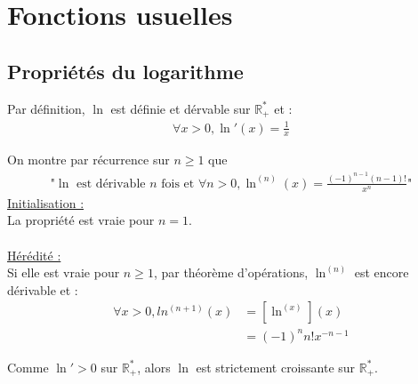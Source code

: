 \documentclass[../main.tex]{subfiles}
\begin{document}
\setcounter{chapter}{4}
\chapter{Fonctions usuelles}
\tableofcontents
\clearpage

\setcounter{section}{1}
\section{Propriétés du logarithme}
Par définition, $\ln$ est définie et dérvable sur $\mathbb{R}_+^*$ et :
\begin{align*}
    \forall x > 0, \ln'(x) = \frac{1}{x}
\end{align*}

\noindent On montre par récurrence sur $n \geq 1$ que 
\begin{align*}
    \text{"$\ln$ est dérivable $n$ fois et } \forall n > 0, \ln^{(n)}(x) = \frac{(-1)^{n - 1}(n - 1)!}{x^n} \text{"}
\end{align*}
\underline{Initialisation :} \\
La propriété est vraie pour $n = 1$. \\ \\

\noindent \underline{Hérédité :} \\
Si elle est vraie pour $n \geq 1$, par théorème d'opérations, $\ln^{(n)}$ est encore dérivable et :
\begin{align*}
    \forall x > 0, ln^{(n + 1)}(x) &= \left[ \ln^{(x)} \right](x) \\
    &= (-1)^n n! x^{-n-1} 
\end{align*} 

\noindent Comme $\ln' > 0$ sur $\mathbb{R}_+^*$, alors $\ln$ est strictement croissante sur $\mathbb{R}_+^*$. \\
\end{document}

